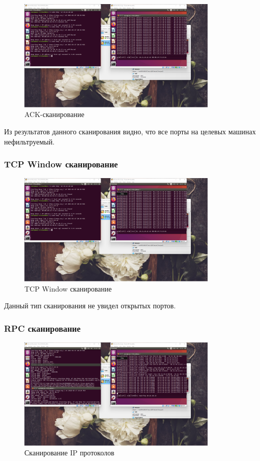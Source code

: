 \documentclass[a4paper]{article}
\begin{document}
  \begin{figure}[H]
    \centering
    \includegraphics[width=0.85\textwidth]{01_00 (30)}
    \caption{ACK-сканирование}
  \end{figure}
  
  Из результатов данного сканирования видно, что все порты на целевых машинах
  нефильтруемый.

  \subsubsection{TCP Window сканирование}

  \begin{figure}[H]
    \centering
    \includegraphics[width=0.85\textwidth]{01_00 (31)}
    \caption{TCP Window сканирование}
  \end{figure}

  Данный тип сканирования не увидел открытых портов.

  \subsubsection{RPC сканирование}

  \begin{figure}[H]
    \centering
    \includegraphics[width=0.85\textwidth]{01_00 (32)}
    \caption{Сканирование IP протоколов}
  \end{figure}
\end{document}
